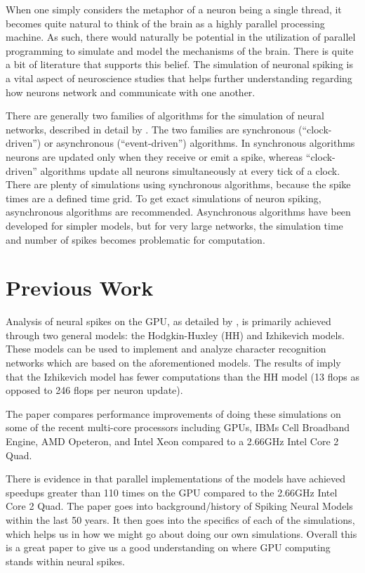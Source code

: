 \documentclass[a4paper]{article}
\begin{document}
When one simply considers the metaphor of a neuron being a single thread, it becomes quite natural to think of the brain as a  highly parallel processing machine. As such, there would naturally be potential in the utilization of parallel programming to simulate and model the mechanisms of the brain. There is quite a bit of literature that supports this belief. The simulation of neuronal spiking is a vital aspect of neuroscience studies that helps further understanding regarding how neurons network and communicate with one another.

There are generally two families of algorithms for the simulation of neural networks, described in detail by \cite{spike}. The two families are synchronous (“clock-driven”) or asynchronous (“event-driven”) algorithms. In synchronous algorithms neurons are updated only when they receive or emit a spike, whereas “clock-driven” algorithms update all neurons simultaneously at every tick of a clock. There are plenty of simulations using synchronous algorithms, because the spike times are a defined time grid. To get exact simulations of neuron spiking, asynchronous algorithms are recommended. Asynchronous algorithms have been developed for simpler models, but for very large networks, the simulation time and number of spikes becomes problematic for computation.

\section{Previous Work}

Analysis of neural spikes on the GPU, as detailed by \cite{accel}, is primarily achieved through two general models: the Hodgkin-Huxley (HH) and Izhikevich models. These models can be used to implement and analyze character recognition networks which are based on the aforementioned models. The results of \cite{accel} imply that the Izhikevich model has fewer computations than the HH model (13 flops as opposed to 246 flops per neuron update).

The paper compares performance improvements of doing these simulations on some of the recent multi-core processors including GPUs, IBMs Cell Broadband Engine, AMD Opeteron, and Intel Xeon compared to a 2.66GHz Intel Core 2 Quad.


There is evidence in \cite{accel} that parallel implementations of the models have achieved speedups greater than 110 times on the GPU compared to the 2.66GHz Intel Core 2 Quad. The paper goes into background/history of Spiking Neural Models within the last 50 years.
 It then goes into the specifics of each of the simulations, which helps us in how we might go about doing our own simulations. Overall this is a great paper to give us a good understanding on where GPU computing stands within neural spikes.
\end{document}
